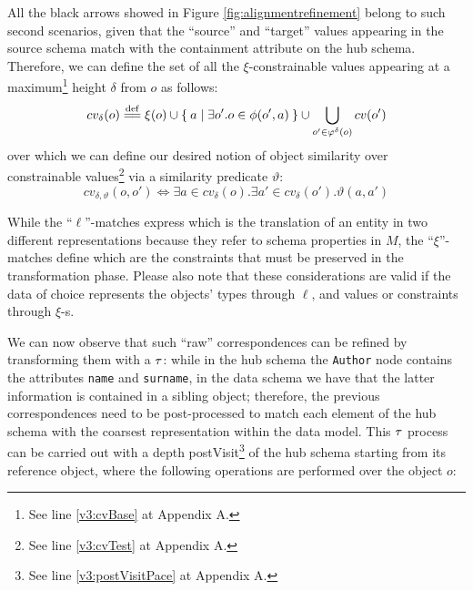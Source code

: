 \begin{example}[continues=ex:examplegraphdata,label=ex:examplereferencedOcaml]
All the black arrows showed in Figure \vref{fig:alignmentrefinement} belong to such second scenarios, given that the ``source'' and ``target'' values appearing in the source schema match with the containment attribute on the hub schema. Therefore, we can define the set of all the $\xi$-constrainable values appearing at a maximum\footnote{See line \ref{v3:cvBase} at Appendix A.} height $\delta$ from $o$ as follows:
\[cv_\delta(o)\overset{\mathrm{def}}{=\mathrel{\mkern-3mu}=}\xi(o)\cup\Set{a|\exists o'. o\in\phi(o',a)}\cup\bigcup_{o'\in\varphi^\delta(o)}cv(o') \]
over which we can define our desired notion of object similarity over constrainable values\footnote{See line \ref{v3:cvTest} at Appendix A.} via a similarity predicate $\vartheta$:
\[cv_{\delta,\vartheta}(o,o')\Leftrightarrow \exists a\in cv_\delta(o).\exists a'\in cv_\delta(o').\vartheta(a,a')\]

While the ``$\ell$''-matches express which is the translation of an entity in two different representations because they refer to schema properties in $M$, the ``$\xi$''-matches define which are the constraints that must be preserved in the transformation phase. Please also note that these considerations are valid if the data of choice represents the objects' types through $\ell$, and values or constraints through $\xi$-s.
\bigskip

We can now observe that such ``raw'' correspondences  can be refined by  transforming them with a $\ttransl$: while in the hub schema the \texttt{Author} node contains the attributes \texttt{name} and \texttt{surname}, in the data schema we have that the latter information is contained in a sibling object; therefore, the previous correspondences need to be post-processed to match each element of the hub schema with the coarsest representation within the data model. This $\ttransl$ process can be carried out with a depth postVisit\footnote{See line \ref{v3:postVisitPace} at Appendix A.} of the hub schema starting from its reference object, where the following operations are performed over the object $o$:


\end{example}
